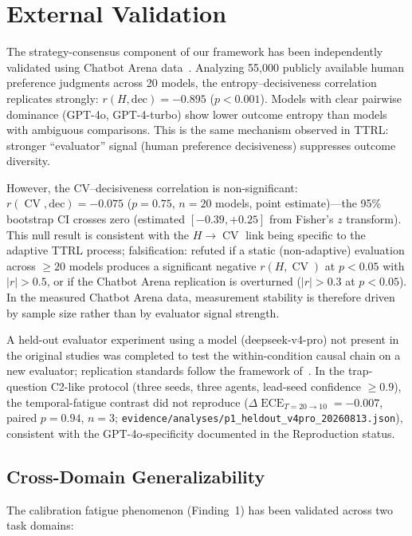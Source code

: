 \documentclass[11pt]{article}
\DeclareMathOperator{\CV}{CV}
\DeclareMathOperator{\ECE}{ECE}
\begin{document}
\section{External Validation}

The strategy-consensus component of our framework has been independently validated using Chatbot Arena data~\cite{zheng2023chatbot,chiang2024chatbot}. Analyzing 55,000 publicly available human preference judgments across 20 models, the entropy--decisiveness correlation replicates strongly: $r(H, \text{dec}) = -0.895$ ($p < 0.001$). Models with clear pairwise dominance (GPT-4o, GPT-4-turbo) show lower outcome entropy than models with ambiguous comparisons. This is the same mechanism observed in TTRL: stronger ``evaluator'' signal (human preference decisiveness) suppresses outcome diversity.

However, the CV--decisiveness correlation is non-significant: $r(\CV, \text{dec}) = -0.075$ ($p = 0.75$, $n = 20$ models, point estimate)---the 95\% bootstrap CI crosses zero (estimated $[-0.39, +0.25]$ from Fisher's $z$ transform). This null result is consistent with the $H \to \CV$ link being specific to the adaptive TTRL process; falsification: refuted if a static (non-adaptive) evaluation across $\geq 20$ models produces a significant negative $r(H, \CV)$ at $p < 0.05$ with $|r| > 0.5$, or if the Chatbot Arena replication is overturned ($|r| > 0.3$ at $p < 0.05$). In the measured Chatbot Arena data, measurement stability is therefore driven by sample size rather than by evaluator signal strength.

A held-out evaluator experiment using a model (deepseek-v4-pro) not present in the original studies was completed to test the within-condition causal chain on a new evaluator; replication standards follow the framework of~\citet{ioannidis2005most,button2013power}. In the trap-question C2-like protocol (three seeds, three agents, lead-seed confidence $\geq 0.9$), the temporal-fatigue contrast did not reproduce ($\Delta\ECE_{T{=}20\to10} = -0.007$, paired $p = 0.94$, $n = 3$; \texttt{evidence/analyses/p1\_heldout\_v4pro\_20260813.json}), consistent with the GPT-4o-specificity documented in the Reproduction status.

\subsection{Cross-Domain Generalizability}

The calibration fatigue phenomenon (Finding~1) has been validated across two task domains:
\end{document}
